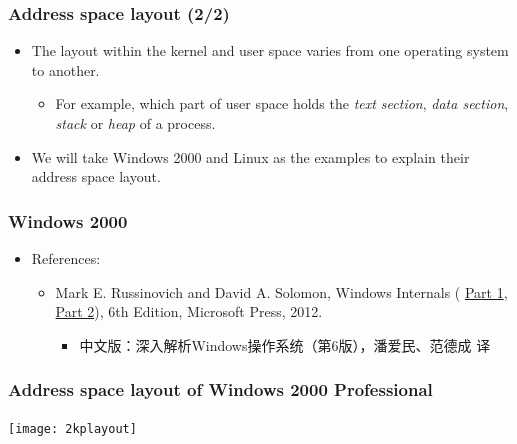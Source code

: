 \documentclass[CJKutf8,dvipsnames,table]{beamer}
\begin{document}
\begin{CJK*}{UTF8}{song}
  
  \begin{frame}
    \frametitle{Address space layout (2/2)} \pause
    \begin{itemize}
    \item{The layout within the kernel and user space varies from one operating system to another.} \pause
      \begin{itemize}
      \item{For example, which part of user space holds the \emph{text section}, \emph{data section}, \emph{stack} or \emph{heap} of a process.} \pause
      \end{itemize}
    \item{We will take Windows 2000 and Linux as the examples to explain their address space layout.}
    \end{itemize}
  \end{frame}
  
  \begin{frame}
    \frametitle{Windows 2000} \pause
    \begin{itemize}
    \item{References:} \pause
      \begin{itemize}
          \item{Mark E. Russinovich and David A. Solomon, Windows Internals ( 
\href{https://www.microsoftpressstore.com/store/windows-internals-part-1-9780735648739}{Part 1},
\href{https://www.microsoftpressstore.com/store/windows-internals-part-2-9780735665873}{Part 2}), 6th Edition, Microsoft Press, 2012.} \pause
        \begin{itemize}
        \item{中文版：深入解析Windows操作系统（第6版），潘爱民、范德成 译} \pause
        \end{itemize}
      \end{itemize}
    \end{itemize}
  \end{frame}
  
  \begin{frame}
    \frametitle{Address space layout of Windows 2000 Professional} \pause
    \begin{center}
      \texttt{[image: 2kplayout]}
    \end{center}
  \end{frame}
  

\end{CJK*}
\end{document}
